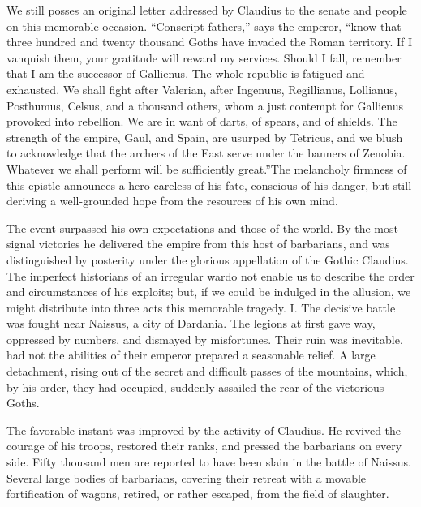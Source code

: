 We still posses an original letter addressed by Claudius to the
senate and people on this memorable occasion. “Conscript
fathers,” says the emperor, “know that three hundred and twenty
thousand Goths have invaded the Roman territory. If I vanquish
them, your gratitude will reward my services. Should I fall,
remember that I am the successor of Gallienus. The whole republic
is fatigued and exhausted. We shall fight after Valerian, after
Ingenuus, Regillianus, Lollianus, Posthumus, Celsus, and a
thousand others, whom a just contempt for Gallienus provoked into
rebellion. We are in want of darts, of spears, and of shields.
The strength of the empire, Gaul, and Spain, are usurped by
Tetricus, and we blush to acknowledge that the archers of the
East serve under the banners of Zenobia. Whatever we shall
perform will be sufficiently great.”\footnotemark[12] The melancholy firmness
of this epistle announces a hero careless of his fate, conscious
of his danger, but still deriving a well-grounded hope from the
resources of his own mind.


The event surpassed his own expectations and those of the world.
By the most signal victories he delivered the empire from this
host of barbarians, and was distinguished by posterity under the
glorious appellation of the Gothic Claudius. The imperfect
historians of an irregular war\footnotemark[13] do not enable us to describe
the order and circumstances of his exploits; but, if we could be
indulged in the allusion, we might distribute into three acts
this memorable tragedy. I. The decisive battle was fought near
Naissus, a city of Dardania. The legions at first gave way,
oppressed by numbers, and dismayed by misfortunes. Their ruin was
inevitable, had not the abilities of their emperor prepared a
seasonable relief. A large detachment, rising out of the secret
and difficult passes of the mountains, which, by his order, they
had occupied, suddenly assailed the rear of the victorious Goths.

The favorable instant was improved by the activity of Claudius.
He revived the courage of his troops, restored their ranks, and
pressed the barbarians on every side. Fifty thousand men are
reported to have been slain in the battle of Naissus. Several
large bodies of barbarians, covering their retreat with a movable
fortification of wagons, retired, or rather escaped, from the
field of slaughter.

